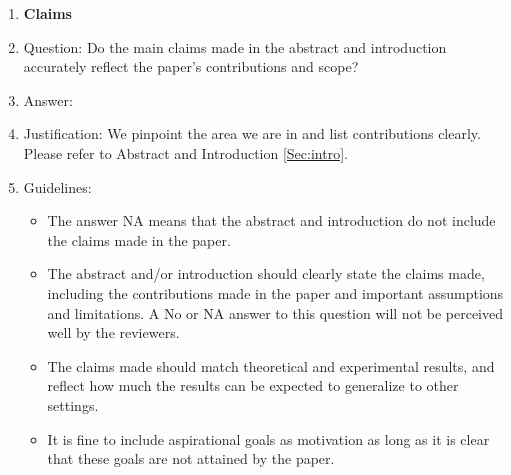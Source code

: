 \documentclass{article}
\begin{document}
\begin{enumerate}

\item {\bf Claims}
    \item[] Question: Do the main claims made in the abstract and introduction accurately reflect the paper's contributions and scope?
    \item[] Answer: \answerYes{} %
    \item[] Justification: We pinpoint the area we are in and list contributions clearly. Please refer to Abstract and Introduction \ref{Sec:intro}.
    \item[] Guidelines:
    \begin{itemize}
        \item The answer NA means that the abstract and introduction do not include the claims made in the paper.
        \item The abstract and/or introduction should clearly state the claims made, including the contributions made in the paper and important assumptions and limitations. A No or NA answer to this question will not be perceived well by the reviewers. 
        \item The claims made should match theoretical and experimental results, and reflect how much the results can be expected to generalize to other settings. 
        \item It is fine to include aspirational goals as motivation as long as it is clear that these goals are not attained by the paper. 
    \end{itemize}


\end{enumerate}
\end{document}
